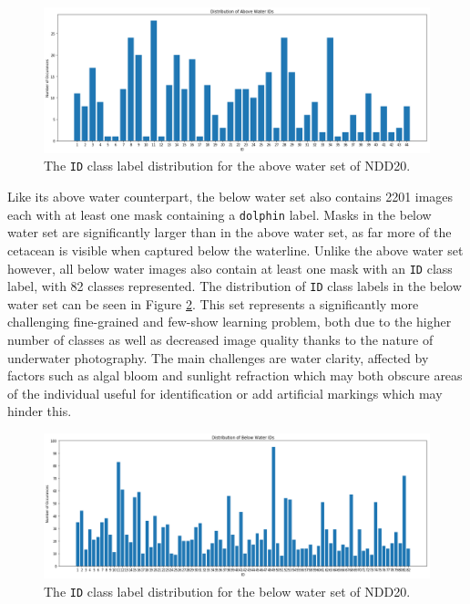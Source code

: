 \begin{figure}
	\begin{center}
		\includegraphics[scale=0.35]{Chapter4/figs/aboveWaterIDDist.png}
	\end{center}
	\caption{The \texttt{ID} class label distribution for the above water set of NDD20.}
	\label{fig:above-water-id-dist}
\end{figure}

Like its above water counterpart, the below water set also contains 2201 images each with at least one mask containing  a \texttt{dolphin} label. Masks in the below water set are significantly larger than in the above water set, as far more of the cetacean is visible when captured below the waterline. Unlike the above water set however, all below water images also contain at least one mask with an \texttt{ID} class label, with 82 classes represented. The distribution of \texttt{ID} class labels in the below water set can be seen in Figure \ref{fig:below-water-id-dist}. This set represents a significantly more challenging fine-grained and few-show learning problem, both due to the higher number of classes as well as decreased image quality thanks to the nature of underwater photography. The main challenges are water clarity, affected by factors such as algal bloom and sunlight refraction which may both obscure areas of the individual useful for identification or add artificial markings which may hinder this. 

\begin{figure}
	\begin{center}
		\includegraphics[scale=0.35]{Chapter4/figs/belowWaterIDDist.png}
	\end{center}
	\caption{The \texttt{ID} class label distribution for the below water set of NDD20.}
	\label{fig:below-water-id-dist}
\end{figure}

